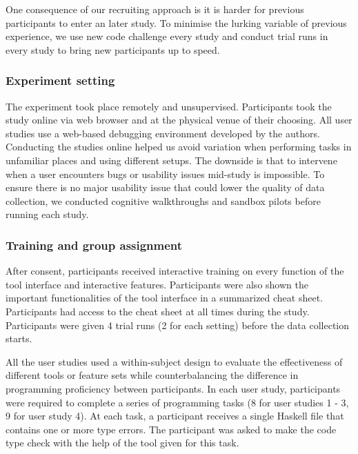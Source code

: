 One consequence of our recruiting approach is it is harder for previous participants to enter an later study. To minimise the lurking variable of previous experience, we use new code challenge every study and conduct trial runs in every study to bring new participants up to speed.

\subsubsection*{\textbf{Experiment setting}}
The experiment took place remotely and unsupervised. Participants took the study online via web browser and at the physical venue of their choosing. All user studies use a web-based debugging environment developed by the authors. Conducting the studies online helped us avoid variation when performing tasks in unfamiliar places and using different setups. The downside is that to intervene when a user encounters bugs or usability issues mid-study is impossible. To ensure there is no major usability issue that could lower the quality of data collection, we conducted cognitive walkthroughs and sandbox pilots before running each study.



\subsubsection*{\textbf{Training and group assignment}}
After consent, participants received interactive training on every function of the tool interface and interactive features. Participants were also shown the important functionalities of the tool interface in a summarized cheat sheet. Participants had access to the cheat sheet at all times during the study. Participants were given 4 trial runs (2 for each setting) before the data collection starts. 

All the user studies used a within-subject design to evaluate the effectiveness of different tools or feature sets while counterbalancing the difference in programming proficiency between participants. In each user study, participants were required to complete a series of programming tasks (8 for user studies 1 - 3, 9 for user study 4). At each task, a participant receives a single Haskell file that contains one or more type errors. The participant was asked to make the code type check with the help of the tool given for this task.



